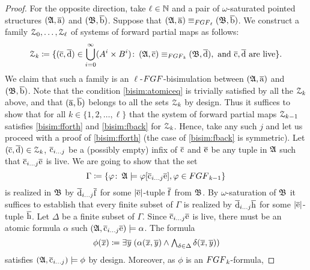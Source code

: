 \begin{proof}
For the opposite direction, take $\ell \in {\mathbb{N}}$ and a pair of $\omega$-saturated pointed structures $({\mathfrak{A}}, \overline{\mathrm{a}})$ and $({\mathfrak{B}}, \overline{\mathrm{b}})$.
Suppose that $(\str{A}, \elemtuplea) \equiv_{\FGF_\ell} (\str{B}, \elemtupleb)$.
We construct a family $\mathcal{Z}_0, \ldots, \mathcal{Z}_\ell$ of systems of forward partial maps as follows:
\[
	\bisimZ_{\mathit{k}} \coloneqq \{ (\elemtuplec, \elemtupled) \in \bigcup_{i=0}^{\infty} (A^i \times B^i) \colon\,  (\str{A}, \elemtuplec) \equiv_{\FGF_{\mathit{k}}} (\str{B}, \elemtupled), \ \text{and} \ \elemtuplec, \elemtupled \ \text{are live} \}.
\]
We claim that such a family is an $\ell$-$\FGF$-bisimulation between $({\mathfrak{A}}, \overline{\mathrm{a}})$ and $({\mathfrak{B}}, \overline{\mathrm{b}})$.
	Note that the condition \ref{bisim:atomiceq} is trivially satisfied by all the $\mathcal{Z}_{\mathit{k}}$ above, and that $(\overline{\mathrm{a}}, \overline{\mathrm{b}})$ belongs to all the sets $\mathcal{Z}_{\mathit{k}}$ by design.
Thus it suffices to show that for all $\mathit{k} \in \{ 1, 2, \ldots, \ell\}$ that the system of forward partial
maps $\mathcal{Z}_{k-1}$ satisfies \ref{bisim:fforth} and \ref{bisim:fback} for $\mathcal{Z}_{\mathit{k}}$.
Hence, take any such $j$ and let us proceed with a proof of \ref{bisim:fforth} (the case of \ref{bisim:fback} is symmetric). 
	Let $(\overline{\mathrm{c}}, \overline{\mathrm{d}}) \in \mathcal{Z}_{\mathit{k}}$, $\overline{\mathrm{c}}_{i\ldots j}$ be a (possibly empty) infix of $\overline{\mathrm{c}}$
and $\overline{\mathrm{e}}$ be any tuple in ${\mathfrak{A}}$ such that $\overline{\mathrm{c}}_{i\ldots j}\overline{\mathrm{e}}$ is live.
We are going to show that the set 
\[
  \Gamma \deff \{ \varphi \colon\, \str{A} \models \varphi[\elemtuplecfromto{i}{j}\elemtuplee], \varphi \in \FGF_{\mathit{k}{-}1} \}
\] 
is realized in ${\mathfrak{B}}$ by $\overline{\mathrm{d}}_{i\ldots j}\overline{\mathrm{f}}$ for some $|\overline{\mathrm{e}}|$-tuple $\overline{\mathrm{f}}$ from ${\mathfrak{B}}$.
By $\omega$-saturation of ${\mathfrak{B}}$ it suffices to establish that every finite subset of $\Gamma$ is realized by $\overline{\mathrm{d}}_{i\ldots j}\overline{\mathrm{h}}$ for some $|\overline{\mathrm{e}}|$-tuple $\overline{\mathrm{h}}$.
Let $\Delta$ be a finite subset of $\Gamma$.
Since $\overline{\mathrm{c}}_{i\ldots j}\overline{\mathrm{e}}$ is live, there must be an atomic formula $\alpha$ such $({\mathfrak{A}}, \overline{\mathrm{c}}_{i\ldots j}\overline{\mathrm{e}}) \models \alpha$.
The formula
\begin{equation*}
  \phi(\overline{\mathit{x}}) \coloneqq \exists{\overline{\mathit{y}}} \; (\alpha(\overline{\mathit{x}}, \overline{\mathit{y}}) \wedge \textstyle\bigwedge_{\delta \in \Delta} \delta(\overline{\mathit{x}}, \overline{\mathit{y}}))
\end{equation*}
satisfies $({\mathfrak{A}}, \overline{\mathrm{c}}_{i\ldots j}) \models \phi$ by design.
Moreover, as $\phi$ is an $\FGF_{\mathit{k}}$-formula,

\end{proof}
